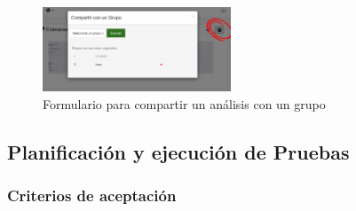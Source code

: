 	    	    	    \begin{figure}[h]
	    	    	    	\centering
	    	    	    	\includegraphics[width=0.5\textwidth]{img/compartir_analisis_grupo}
	    	    	    	\caption{Formulario para compartir un análisis con un grupo}
	    	    	    	\label{compartir_analisis_grupo}
	    	    	    \end{figure}	    	    
\clearpage	    	    	    	    
\subsection{Planificación y ejecución de Pruebas}
\subsubsection{Criterios de aceptación}

